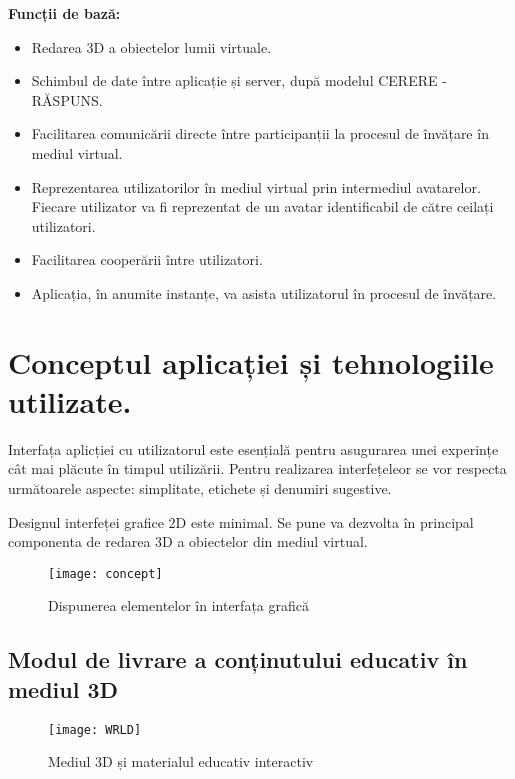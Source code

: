 \textbf{Funcții de bază:}
\begin{itemize}
\item Redarea 3D a obiectelor lumii virtuale.
\item Schimbul de date între aplicație și server, după modelul CERERE - RĂSPUNS.
\item Facilitarea comunicării directe între participanții la procesul de învățare în mediul virtual.
\item Reprezentarea utilizatorilor în mediul virtual prin intermediul avatarelor. Fiecare utilizator va fi reprezentat de un avatar identificabil de către ceilați utilizatori.
\item Facilitarea cooperării între utilizatori.
\item Aplicația, în anumite instanțe, va asista utilizatorul în procesul de învățare. 
\end{itemize}

\section{Conceptul aplicației și tehnologiile utilizate.}

\par Interfața aplicției cu utilizatorul este esențială pentru asugurarea unei experințe cât mai plăcute în timpul utilizării. Pentru realizarea interfețeleor se vor respecta următoarele aspecte: simplitate, etichete și denumiri sugestive.
\par Designul interfeței grafice 2D este minimal. Se pune va dezvolta în principal componenta de redarea 3D a obiectelor din mediul virtual.

\begin{figure}[ht]
    \centering
    \texttt{[image: concept]}
    \caption{Dispunerea elementelor în interfața grafică}
    \label{fig:vorldd}
\end{figure}

\newpage
\subsection{Modul de livrare a conținutului educativ în mediul 3D}

\begin{figure}[ht]
    \centering
    \texttt{[image: WRLD]}
    \caption{Mediul 3D și materialul educativ interactiv}
    \label{fig:vorldd}
\end{figure}

\newpage

